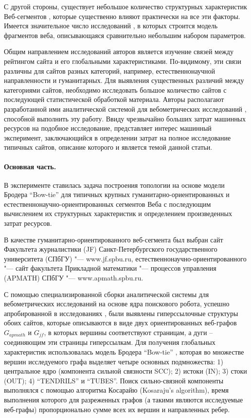 С другой стороны, существует небольшое количество структурных характеристик Веб-сегментов \cite{ChoRoy}, которые существенно влияют практически на все эти факторы. Имеется значительное число исследований \cite{Kleinberg,ChoRoy,BroderKumarMaghoul,AguilloGranadinoOrtega,StuartThelwallHarries,Chakrabarti,Thelwall,Pechnikov,PechnikovNwohiri}, в которых строится модель фрагментов веба, описывающаяся сравнительно небольшим набором параметров.

Общим направлением исследований авторов является изучение связей между рейтингом сайта и его глобальными характеристиками. По-видимому, эти связи различны для сайтов разных категорий, например, естественнонаучной направленности и гуманитарных. Для выявления существенных различий между категориями сайтов, необходимо исследовать большое количество сайтов с последующей статистической обработкой материала. Авторы располагают разработанной ими аналитической системой для вебометрических исследований \cite{BlekanovSergeevMaksimov,BlekanovSergeevMartynenko}, способной выполнить эту работу. Ввиду чрезвычайно больших затрат машинных ресурсов на подобное исследование, представляет интерес машинный эксперимент, заключающийся в определении затрат на полное исследование типичных сайтов, описание которого и является темой данной статьи.

\paragraph{Основная часть.} В эксперименте ставилась задача построения топологии на основе модели Бродера “Bow-tie” \cite{BroderKumarMaghoul,Thelwall} для типичных крупных гуманитарно-ориентированных и естественнонаучно-ориентированных сегментов Веба с последующим вычислением их структурных характеристик и определением произведенных затрат ресурсов.

В качестве гуманитарно-ориентированного веб-сегмента был выбран сайт Факультета журналистики (JF) Санкт-Петербургского государственного университета (СПбГУ) "--- www.jf.spbu.ru, естественнонаучно-ориентированного "--- сайт факультета Прикладной математики "--- процессов управления (APMATH) СПбГУ "--- www.apmath.spbu.ru.

С помощью специализированной сборки аналитической системы для вебометрических исследований на основе ядра поискового робота, успешно апробированной в исследованиях \cite{BlekanovSergeev,MaksimovBlekanov} , были выявлены гиперссылочные структуры обоих сайтов, которые описываются в виде двух ориентированных веб-графов \(G_{apmath}\) и \(G_{jf}\), в которых вершины соответствуют страницам, а дуги – соединяющим эти страницы гиперссылкам. Для получения глобальных характеристик использовалась модель Бродера “Bow-tie” \cite{BroderKumarMaghoul}, которая во множестве вершин исследуемого графа выделяет четыре основных подмножества: 1) центральное ядро (компонента сильной связности SCC); 2) истоки (IN); 3) стоки (OUT); 4) “TENDRILS” и “TUBES”. Поиск сильно-связной компоненты выполнялся с помощью алгоритма Косарайю \cite{Sedgewick} (Kosaraju's algorithm), время выполнения которого для разреженных графов (а такими являются исследуемые веб-графы) пропорционально сумме всех их вершин и направленных ребер.

